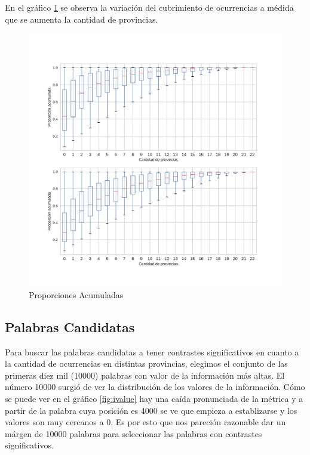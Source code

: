 En el gráfico \ref{fig:propAcum5000} se observa la variación del cubrimiento de ocurrencias a médida que se aumenta la cantidad de provincias. 


\begin{figure}[!h]
\centering
\includegraphics[width=1.0\textwidth]{./images/PropAcum5000.pdf}
\caption{Proporciones Acumuladas} 
\label{fig:propAcum5000} 
\end{figure}

\subsection{Palabras Candidatas} %
\label{sub:palabras_candidatas}
Para buscar las palabras candidatas a tener contrastes significativos en cuanto a la cantidad de ocurrencias en distintas provincias, elegimos el conjunto de las primeras 
diez mil (10000) palabras con valor de la información más altas. El número 10000 surgió de ver la distribución de los valores de la información. Cómo se puede ver en 
el gráfico \ref{fig:ivalue} hay una caída pronunciada de la métrica y a partir de la palabra cuya posición es 4000 se ve que empieza a establizarse y los valores son 
muy cercanos a 0. Es por esto que nos pareción razonable dar un márgen de 10000 palabras para seleccionar las palabras con contrastes significativos.


